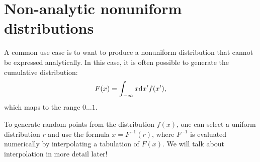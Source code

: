 \section{Non-analytic nonuniform distributions}

A common use case is to want to produce a nonuniform distribution that
cannot be expressed analytically. In this case, it is often possible
to generate the cumulative distribution: 
\begin{equation}
F(x) = \int_{-\infty}{x} {\rm d}x' f(x'),
\end{equation}
which maps to the range $0\ldots 1$.

To generate random points from the distribution $f(x)$, one can select
a uniform distribution $r$ and use the formula $x = F^{-1}(r)$, where
$F^{-1}$ is evaluated numerically by interpolating a tabulation of
$F(x)$. We will talk about interpolation in more detail later!
